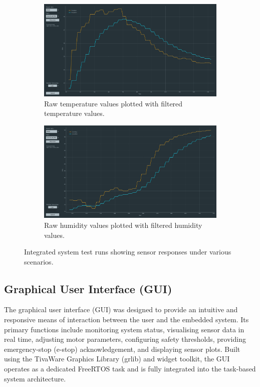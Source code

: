 \documentclass[a4paper, 11pt, titlepage]{article}
\begin{document}
\begin{figure}[H]
    \begin{subfigure}{0.45\textwidth}
        \centering
        \includegraphics[width=\linewidth]{images/temp_serial_plot.png}
        \caption{Raw temperature values plotted with filtered temperature values.}
        \label{fig:temp_serial}
    \end{subfigure}
    \hfill
    \begin{subfigure}{0.45\textwidth}
        \centering
        \includegraphics[width=\linewidth]{images/humi_Serial_plot.png}
        \caption{Raw humidity values plotted with filtered humidity values.}
        \label{fig:humi_serial}
    \end{subfigure}

    \caption{Integrated system test runs showing sensor responses under various scenarios.}
    \label{fig:integrated-tests}
\end{figure}


\newpage
\subsection{Graphical User Interface (GUI)}
The graphical user interface (GUI) was designed to provide an intuitive and responsive means of interaction between the user and the embedded system. Its primary functions include monitoring system status, visualising sensor data in real time, adjusting motor parameters, configuring safety thresholds, providing emergency-stop (e-stop) acknowledgement, and displaying sensor plots. Built using the TivaWare Graphics Library (grlib) \parencite{grlib} and widget toolkit, the GUI operates as a dedicated FreeRTOS task and is fully integrated into the task-based system architecture. 
\end{document}
